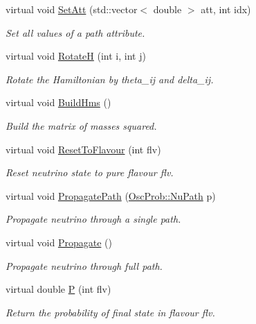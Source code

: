 \begin{DoxyCompactItemize}
virtual void \hyperlink{classOscProb_1_1PMNS__Base_aa001479b5f5828c3d16ed087f96ecbcc}{Set\+Att} (std\+::vector$<$ double $>$ att, int idx)
\begin{DoxyCompactList}\small\item\em Set all values of a path attribute. \end{DoxyCompactList}\item 
virtual void \hyperlink{classOscProb_1_1PMNS__Base_aae18afd69074211335f49ec40e6011b9}{RotateH} (int i, int j)
\begin{DoxyCompactList}\small\item\em Rotate the Hamiltonian by theta\+\_\+ij and delta\+\_\+ij. \end{DoxyCompactList}\item 
virtual void \hyperlink{classOscProb_1_1PMNS__Base_ad0faf5eae755afb1baa1fcd5ffebad41}{Build\+Hms} ()
\begin{DoxyCompactList}\small\item\em Build the matrix of masses squared. \end{DoxyCompactList}\item 
virtual void \hyperlink{classOscProb_1_1PMNS__Base_ac0d4bf8ff1318ef96d3dafa62e0cec25}{Reset\+To\+Flavour} (int flv)
\begin{DoxyCompactList}\small\item\em Reset neutrino state to pure flavour flv. \end{DoxyCompactList}\item 
virtual void \hyperlink{classOscProb_1_1PMNS__Base_accb08503acc162188041d7a96a280462}{Propagate\+Path} (\hyperlink{structOscProb_1_1NuPath}{Osc\+Prob\+::\+Nu\+Path} p)
\begin{DoxyCompactList}\small\item\em Propagate neutrino through a single path. \end{DoxyCompactList}\item 
virtual void \hyperlink{classOscProb_1_1PMNS__Base_a054e3a8b05b9a958b6fa416e4a835e3e}{Propagate} ()
\begin{DoxyCompactList}\small\item\em Propagate neutrino through full path. \end{DoxyCompactList}\item 
virtual double \hyperlink{classOscProb_1_1PMNS__Base_a0dc4d45bc3d7e03b9abbf5b4e100cc22}{P} (int flv)
\begin{DoxyCompactList}\small\item\em Return the probability of final state in flavour flv. \end{DoxyCompactList}\end{DoxyCompactItemize}
